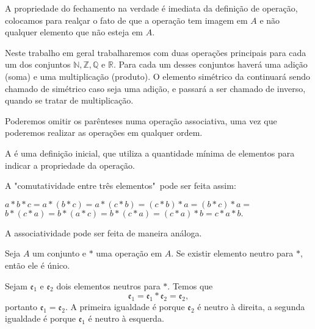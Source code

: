 \documentclass[../main.tex]{subfiles}
\begin{document}
A propriedade do fechamento na verdade é imediata da definição de operação, colocamos para realçar o fato de que a operação tem imagem em $A$ e não qualquer elemento que não esteja em $A$.
\begin{obs}
    Neste trabalho em geral trabalharemos com duas operações principais para cada um dos conjuntos $\mathbb{N}, \mathbb{Z}, \mathbb{Q}$ e $\mathbb{R}$. Para cada um desses conjuntos haverá uma adição (soma) e uma multiplicação (produto). O elemento simétrico da  continuará sendo chamado de simétrico caso seja uma adição, e passará a ser chamado de inverso, quando se tratar de multiplicação.
\end{obs}
Poderemos omitir os parênteses numa operação associativa, uma vez que poderemos realizar as operações em qualquer ordem.

A  é uma definição inicial, que utiliza a quantidade mínima de elementos para indicar a propriedade da operação.
\begin{ex}
    A "comutatividade entre três elementos"\ pode ser feita assim: 
    \begin{center}
        $a * b * c = a * (b*c) = a*(c*b) = (c*b)*a = (b*c)*a =$ \\
         $b*(c*a) = b*(a*c) = b*(c*a) =(c*a)*b = c * a * b.$
    \end{center}
\end{ex}



A associatividade pode ser feita de maneira análoga.

\begin{teo}\label{agb-teo-neutroUnico}
    Seja $A$ um conjunto e $*$ uma operação em $A$. Se existir elemento neutro para $*$, então ele é único.
\end{teo}
\begin{dem}
    Sejam $\mathfrak{e_1}$ e $\mathfrak{e_2}$ dois elementos neutros para $*$. Temos que 
    \[ \mathfrak{e_1} = \mathfrak{e_1} * \mathfrak{e_2} = \mathfrak{e_2}, \] 
    portanto ${\mathfrak{e_1} = \mathfrak{e_2}}$. A primeira igualdade é porque $\mathfrak{e_2}$ é neutro à direita, a segunda igualdade é porque $\mathfrak{e_1}$ é neutro à esquerda.
\end{dem}
\end{document}

